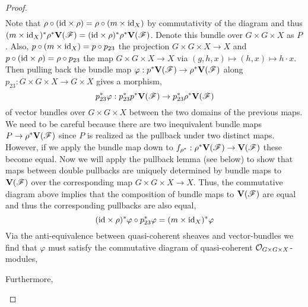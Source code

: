 \documentclass[12pt]{article}
\begin{document}
\begin{proof}
\begin{align*}
\end{align*}
Note that $\rho \circ (\mathrm{id} \times \rho) = \rho \circ (m \times \mathrm{id}_X)$ by commutativity of the diagram and thus $(m \times \mathrm{id}_X)^* \rho^* \mathbf{V}(\mathscr{F}) = (\mathrm{id} \times \rho)^* \rho^* \mathbf{V}(\mathscr{F})$. Denote this bundle over $G \times G \times X$ as $P$. Also, $p \circ (m \times \mathrm{id}_X) = p \circ p_{23}$ the projection $G \times G \times X \to X$ and $p \circ (\mathrm{id} \times \rho) = \rho \circ p_{23}$ the map $G \times G \times X \to X$ via $(g, h, x) \mapsto (h, x) \mapsto h \cdot x$. Then pulling back the bundle map $\varphi : p^* \mathbf{V}(\mathscr{F}) \to \rho^* \mathbf{V}(\mathscr{F})$ along $p_{23} : G \times G \times X \to G \times X$ gives a morphism,
\[ p_{23}^* \varphi : p_{23}^* p^* \mathbf{V}(\mathscr{F}) \to p_{23}^* \rho^* \mathbf{V}(\mathscr{F}) \]
of vector bundles over $G \times G \times X$ between the two domains of the previous maps.
We need to be careful because there are two inequivalent bundle maps $P \to \rho^* \mathbf{V}(\mathscr{F})$ since $P$ is realized as the pullback under two distinct maps. However, if we apply the bundle map down to $f_{\rho^*} : \rho^* \mathbf{V}(\mathscr{F}) \to \mathbf{V}(\mathscr{F})$ these become equal. Now we will apply the pullback lemma (see below) to show that maps between double pullbacks are uniquely determined by bundle maps to $\mathbf{V}(\mathscr{F})$ over the corresponding map $G \times G \times X \to X$. Thus, the commutative diagram above implies that the composition of bundle maps to $\mathbf{V}(\mathscr{F})$ are equal and thus the corresponding pullbacks are also equal,
\[ (\mathrm{id} \times \rho)^* \varphi \circ p_{23}^* \varphi = (m \times \mathrm{id}_X)^* \varphi \]
Via the anti-equivalence between quasi-coherent sheaves and vector-bundles we find that $\varphi$ must satisfy the commutative diagram of quasi-coherent $\mathcal{O}_{G \times G \times X}$-modules,
\begin{center}
\end{center}
Furthermore,
\begin{center}
\end{center}

\end{proof}
\end{document}
